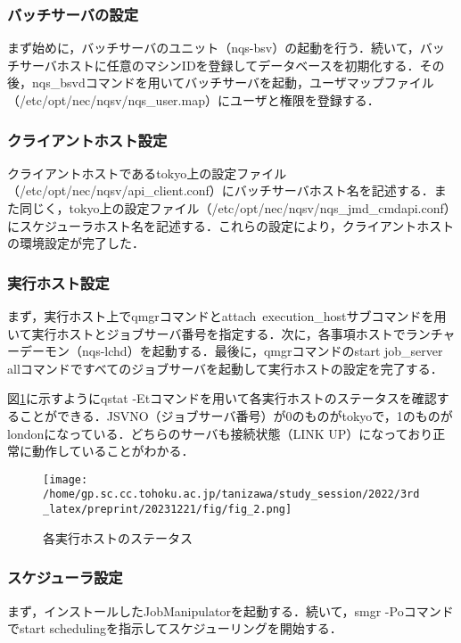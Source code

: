 \documentclass[a4paper,oneside,twocolumn,notitlepage,dvipdfmx]{jsarticle}
\begin{document}
\subsubsection{バッチサーバの設定}
まず始めに，バッチサーバのユニット（nqs-bsv）の起動を行う．続いて，バッチサーバホストに任意のマシンIDを登録してデータベースを初期化する．その後，nqs\_bsvdコマンドを用いてバッチサーバを起動，ユーザマップファイル（/etc/opt/nec/nqsv/nqs\_user.map）にユーザと権限を登録する．\par

\subsubsection{クライアントホスト設定}
クライアントホストであるtokyo上の設定ファイル（/etc/opt/nec/nqsv/api\_client.conf）にバッチサーバホスト名を記述する．また同じく，tokyo上の設定ファイル（/etc/opt/nec/nqsv/nqs\_jmd\_cmdapi.conf）にスケジューラホスト名を記述する．これらの設定により，クライアントホストの環境設定が完了した．\par

\subsubsection{実行ホスト設定}
まず，実行ホスト上でqmgrコマンドとattach\ execution\_hostサブコマンドを用いて実行ホストとジョブサーバ番号を指定する．次に，各事項ホストでランチャーデーモン（nqs-lchd）を起動する．最後に，qmgrコマンドのstart job\_server allコマンドですべてのジョブサーバを起動して実行ホストの設定を完了する．\par
図\ref{fig_2}に示すようにqstat -Etコマンドを用いて各実行ホストのステータスを確認することができる．JSVNO（ジョブサーバ番号）が0のものがtokyoで，1のものがlondonになっている．どちらのサーバも接続状態（LINK UP）になっており正常に動作していることがわかる．

\begin{figure}[h]
  \centering
  \texttt{[image: /home/gp.sc.cc.tohoku.ac.jp/tanizawa/study\_session/2022/3rd\_latex/preprint/20231221/fig/fig\_2.png]}
  \caption{各実行ホストのステータス}
  \label{fig_2}
\end{figure}

\subsubsection{スケジューラ設定}
まず，インストールしたJobManipulatorを起動する．続いて，smgr -Poコマンドでstart schedulingを指示してスケジューリングを開始する．\par
\end{document}
